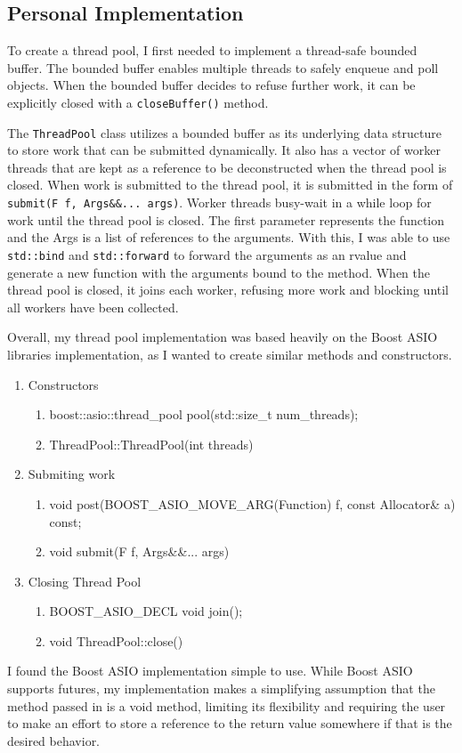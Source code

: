 \documentclass[12pt]{article}
\begin{document}
\subsection{Personal Implementation}

To create a thread pool, I first needed to implement a thread-safe bounded buffer. The bounded buffer enables multiple threads to safely enqueue and poll objects. When the bounded buffer decides to refuse further work, it can be explicitly closed with a \texttt{closeBuffer()} method.

The \texttt{ThreadPool} class utilizes a bounded buffer as its underlying data structure to store work that can be submitted dynamically. It also has a vector of worker threads that are kept as a reference to be deconstructed when the thread pool is closed. When work is submitted to the thread pool, it is submitted in the form of \texttt{submit(F f, Args\&\&... args)}. Worker threads busy-wait in a while loop for work until the thread pool is closed. The first parameter represents the function and the Args is a list of references to the arguments. With this, I was able to use \texttt{std::bind} and \texttt{std::forward} to forward the arguments as an rvalue and generate a new function with the arguments bound to the method. When the thread pool is closed, it joins each worker, refusing more work and blocking until all workers have been collected. 

Overall, my thread pool implementation was based heavily on the Boost ASIO libraries implementation, as I wanted to create similar methods and constructors.
\begin{enumerate}
    \item Constructors
    \begin{enumerate}
        \item boost::asio::thread\_pool pool(std::size\_t num\_threads); 
        \item ThreadPool::ThreadPool(int threads) 
    \end{enumerate}
    \item Submiting work
    \begin{enumerate}
        \item   void post(BOOST\_ASIO\_MOVE\_ARG(Function) f, const Allocator\& a) const;
        \item void submit(F f, Args\&\&... args)
    \end{enumerate}
    \item Closing Thread Pool
    \begin{enumerate}
        \item   BOOST\_ASIO\_DECL void join();
        \item   void ThreadPool::close()
    \end{enumerate}
\end{enumerate}
I found the Boost ASIO implementation simple to use. While Boost ASIO supports futures, my implementation makes a simplifying assumption that the method passed in is a void method, limiting its flexibility and requiring the user to make an effort to store a reference to the return value somewhere if that is the desired behavior.
\end{document}
